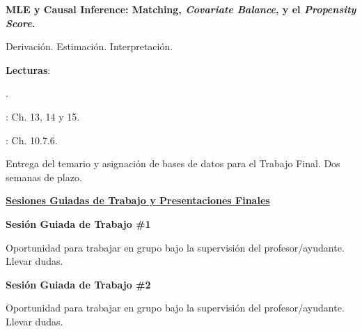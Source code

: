 \documentclass[letterpaper]{article}
\renewenvironment{itemize}{
  \begin{list}{}{
    \setlength{\leftmargin}{1.5em}
  }
}{
  \end{list}
}
\begin{document}
\begin{enumerate}[label=\roman*.]
       \begin{itemize} 
        \item[20.] {\bf MLE y Causal Inference: Matching, \emph{Covariate Balance}, y el \emph{Propensity Score}.}
        \begin{itemize} 
          \item[$\circ$] Derivaci\'on. Estimaci\'on. Interpretaci\'on.
          \item[$\circ$] {\bf Lecturas}: 
            \begin{itemize} 
              \item[$\diamond$] \href{https://github.com/hbahamonde/MLE/raw/master/Readings/King_Preprocessing.pdf}{\textcite{Ho2006}}.
              \item[$\diamond$] \textcite{Imbens2015}: Ch. 13, 14 y 15.
              \item[$\diamond$] \href{https://arcruz0.github.io/libroadp/index.html}{\emph{\textcite{Urdinez:2019aa}}}: Ch. 10.7.6.
          \end{itemize}
        \end{itemize}
      \end{itemize}


\item[{\color{red}\Pointinghand}] Entrega del temario y asignaci\'on de bases de datos para el Trabajo Final. Dos semanas de plazo.


\item {\bf {\color{ForestGreen}\underline{Sesiones Guiadas de Trabajo y Presentaciones Finales}}}



     \begin{itemize} 
        \item[21.] {\bf Sesi\'on Guiada de Trabajo \#1}
        \begin{itemize} 
          \item[$\circ$] Oportunidad para trabajar en grupo bajo la supervisi\'on del profesor/ayudante. Llevar dudas.
        \end{itemize}
      \end{itemize}


       \begin{itemize} 
        \item[22.] {\bf Sesi\'on Guiada de Trabajo \#2}
        \begin{itemize} 
          \item[$\circ$] Oportunidad para trabajar en grupo bajo la supervisi\'on del profesor/ayudante. Llevar dudas.
        \end{itemize}
      \end{itemize}



\end{enumerate}
\end{document}
